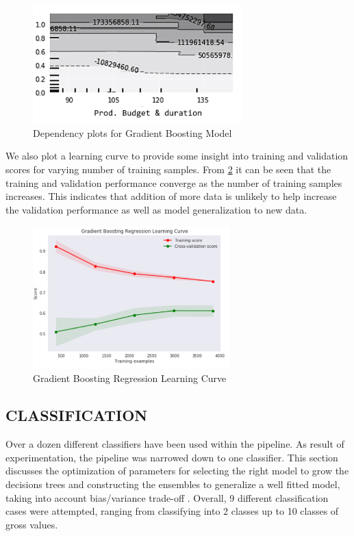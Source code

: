 \begin{figure}[h]
\centering
\includegraphics[width=3.2in]{figures/gb_dependency_4}
\caption{Dependency plots for Gradient Boosting Model} 
\label{fig:gradient_boost_dependency}
\end{figure}

We also plot a learning curve to provide some insight into training and validation scores for varying number of training samples. From \figurename{} \ref{fig:gradient_boost} it can be seen that the training and validation performance converge as the number of training samples increases. This indicates that addition of  more data is unlikely to help increase the validation performance as well as model generalization to new data.

\begin{figure}[h]
\centering
\includegraphics[width=3.0in]{figures/gradient_boost}
\caption{Gradient Boosting Regression Learning Curve} 
\label{fig:gradient_boost}
\end{figure}

\subsection{CLASSIFICATION}

Over a dozen different classifiers have been used within the pipeline. As result of experimentation, the pipeline was narrowed down to one classifier. This section discusses the optimization of parameters for selecting the right model to grow the decisions trees and constructing the ensembles to generalize a well fitted model, taking into account bias/variance trade-off \cite{biasvariance}. Overall, 9 different classification cases were attempted, ranging from classifying into 2 classes up to 10 classes of gross values. 

